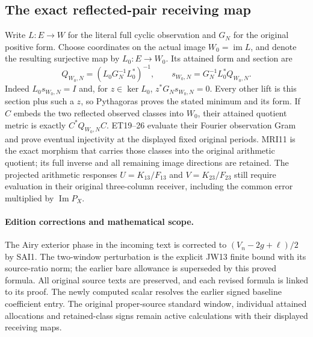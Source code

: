 \subsection{The exact reflected-pair receiving map}
Write $L:E\to W$ for the literal full cyclic observation and
$G_N$ for the original positive form. Choose coordinates on the
actual image $W_0=\operatorname{im}L$, and denote the resulting
surjective map by $L_0:E\to W_0$. Its attained form and section are
\[
 Q_{W_0,N}=(L_0G_N^{-1}L_0^*)^{-1},\qquad
 s_{W_0,N}=G_N^{-1}L_0^*Q_{W_0,N}.
 \tag{MRI11}
\]
Indeed $L_0s_{W_0,N}=I$ and, for $z\in\ker L_0$,
$z^*G_Ns_{W_0,N}=0$. Every other lift is this section plus such a
$z$, so Pythagoras proves the stated minimum and its form.
If $C$ embeds the two reflected observed classes into $W_0$, their
attained quotient metric is exactly $C^*Q_{W_0,N}C$. ET19--26
evaluate their Fourier observation Gram and prove eventual
injectivity at the displayed fixed original periods. MRI11 is
the exact morphism that carries those classes into the original
arithmetic quotient; its full inverse and all remaining image
directions are retained. The projected arithmetic responses
$U=K_{13}/F_{13}$ and $V=K_{23}/F_{23}$ still require evaluation
in their original three-column receiver, including the common
error multiplied by $\operatorname{Im}P_X$.

\paragraph{Edition corrections and mathematical scope.}
The Airy exterior phase in the incoming text is corrected to
$(V_n-2g+\ell)/2$ by SAI1. The two-window perturbation is the
explicit JW13 finite bound with its source-ratio norm; the earlier
bare allowance is superseded by this proved formula. All original
source texts are preserved, and each revised formula is linked to
its proof. The newly computed scalar resolves the earlier signed
baseline coefficient entry. The original proper-source standard
window, individual attained allocations and retained-class signs
remain active calculations with their displayed receiving maps.
